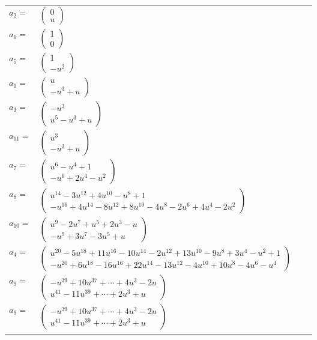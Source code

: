 \documentclass[1p]{elsarticle_modified}
\theoremstyle{definition}
\begin{document}
\begin{tabular}{m{7pt} m{180pt} m{7pt} m{180pt} }
\flushright $a_{2}=$&$\begin{pmatrix}0\\u\end{pmatrix}$ \\
\flushright $a_{6}=$&$\begin{pmatrix}1\\0\end{pmatrix}$ \\
\flushright $a_{5}=$&$\begin{pmatrix}1\\- u^2\end{pmatrix}$ \\
\flushright $a_{1}=$&$\begin{pmatrix}u\\- u^3+u\end{pmatrix}$ \\
\flushright $a_{3}=$&$\begin{pmatrix}- u^3\\u^5- u^3+u\end{pmatrix}$ \\
\flushright $a_{11}=$&$\begin{pmatrix}u^3\\- u^3+u\end{pmatrix}$ \\
\flushright $a_{7}=$&$\begin{pmatrix}u^6- u^4+1\\- u^6+2 u^4- u^2\end{pmatrix}$ \\
\flushright $a_{8}=$&$\begin{pmatrix}u^{14}-3 u^{12}+4 u^{10}- u^8+1\\- u^{16}+4 u^{14}-8 u^{12}+8 u^{10}-4 u^8-2 u^6+4 u^4-2 u^2\end{pmatrix}$ \\
\flushright $a_{10}=$&$\begin{pmatrix}u^9-2 u^7+u^5+2 u^3- u\\- u^9+3 u^7-3 u^5+u\end{pmatrix}$ \\
\flushright $a_{4}=$&$\begin{pmatrix}u^{20}-5 u^{18}+11 u^{16}-10 u^{14}-2 u^{12}+13 u^{10}-9 u^8+3 u^4- u^2+1\\- u^{20}+6 u^{18}-16 u^{16}+22 u^{14}-13 u^{12}-4 u^{10}+10 u^8-4 u^6- u^4\end{pmatrix}$ \\
\flushright $a_{9}=$&$\begin{pmatrix}- u^{39}+10 u^{37}+\cdots+4 u^3-2 u\\u^{41}-11 u^{39}+\cdots+2 u^3+u\end{pmatrix}$\\ \flushright $a_{9}=$&$\begin{pmatrix}- u^{39}+10 u^{37}+\cdots+4 u^3-2 u\\u^{41}-11 u^{39}+\cdots+2 u^3+u\end{pmatrix}$\\&\end{tabular}
\end{document}
